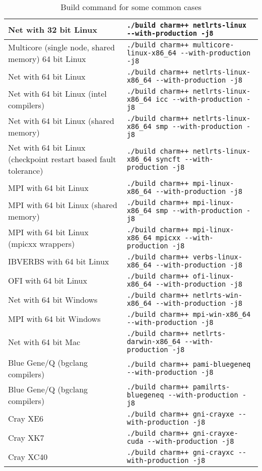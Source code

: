 \begin{table}[ht]
\begin{tabular}{|p{6cm}|p{9cm}|}
\hline
Net with 32 bit Linux & \verb|./build charm++ netlrts-linux --with-production -j8|
\\\hline
Multicore (single node, shared memory) 64 bit Linux & \verb|./build charm++ multicore-linux-x86_64 --with-production -j8|
\\\hline
Net with 64 bit Linux & \verb|./build charm++ netlrts-linux-x86_64 --with-production -j8|
\\\hline
Net with 64 bit Linux (intel compilers) & \verb|./build charm++ netlrts-linux-x86_64 icc --with-production -j8|
\\\hline
Net with 64 bit Linux (shared memory) & \verb|./build charm++ netlrts-linux-x86_64 smp --with-production -j8|
\\\hline
Net with 64 bit Linux (checkpoint restart based fault tolerance) & \verb|./build charm++ netlrts-linux-x86_64 syncft --with-production -j8|
\\\hline
MPI with 64 bit Linux & \verb|./build charm++ mpi-linux-x86_64 --with-production -j8|
\\\hline
MPI with 64 bit Linux (shared memory) & \verb|./build charm++ mpi-linux-x86_64 smp --with-production -j8|
\\\hline
MPI with 64 bit Linux (mpicxx wrappers) & \verb|./build charm++ mpi-linux-x86_64 mpicxx --with-production -j8|
\\\hline
IBVERBS with 64 bit Linux & \verb|./build charm++ verbs-linux-x86_64 --with-production -j8|
\\\hline
OFI with 64 bit Linux & \verb|./build charm++ ofi-linux-x86_64 --with-production -j8|
\\\hline
Net with 64 bit Windows & \verb|./build charm++ netlrts-win-x86_64 --with-production -j8|
\\\hline
MPI with 64 bit Windows & \verb|./build charm++ mpi-win-x86_64 --with-production -j8|
\\\hline
Net with 64 bit Mac & \verb|./build charm++ netlrts-darwin-x86_64 --with-production -j8|
\\\hline
Blue Gene/Q (bgclang compilers) & \verb|./build charm++ pami-bluegeneq --with-production -j8|
\\\hline
Blue Gene/Q (bgclang compilers) & \verb|./build charm++ pamilrts-bluegeneq --with-production -j8|
\\\hline
Cray XE6 & \verb|./build charm++ gni-crayxe --with-production -j8|
\\\hline
Cray XK7 & \verb|./build charm++ gni-crayxe-cuda --with-production -j8|
\\\hline
Cray XC40 & \verb|./build charm++ gni-crayxc --with-production -j8|
\\\hline
\end{tabular}
\caption{Build command for some common cases}
\label{tab:buildlist}
\end{table}

